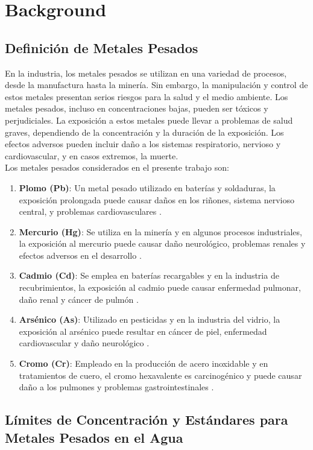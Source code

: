 \section{Background}
\subsection{Definición de Metales Pesados}
En la industria, los metales pesados se utilizan en una variedad de procesos, desde la manufactura hasta la minería. Sin embargo, la manipulación y control de estos metales presentan serios riesgos para la salud y el medio ambiente. Los metales pesados, incluso en concentraciones bajas, pueden ser tóxicos y perjudiciales. La exposición a estos metales puede llevar a problemas de salud graves, dependiendo de la concentración y la duración de la exposición. Los efectos adversos pueden incluir daño a los sistemas respiratorio, nervioso y cardiovascular, y en casos extremos, la muerte.\\

Los metales pesados considerados en el presente trabajo son:
\begin{enumerate}
    \item \textbf{Plomo (Pb)}: Un metal pesado utilizado en baterías y soldaduras, la exposición prolongada puede causar daños en los riñones, sistema nervioso central, y problemas cardiovasculares \cite{matthews2019}.
    \item \textbf{Mercurio (Hg)}: Se utiliza en la minería y en algunos procesos industriales, la exposición al mercurio puede causar daño neurológico, problemas renales y efectos adversos en el desarrollo \cite{rao2020}.
    \item \textbf{Cadmio (Cd)}: Se emplea en baterías recargables y en la industria de recubrimientos, la exposición al cadmio puede causar enfermedad pulmonar, daño renal y cáncer de pulmón \cite{nguyen2022}.
    \item \textbf{Arsénico (As)}: Utilizado en pesticidas y en la industria del vidrio, la exposición al arsénico puede resultar en cáncer de piel, enfermedad cardiovascular y daño neurológico \cite{smith2021}.
    \item \textbf{Cromo (Cr)}: Empleado en la producción de acero inoxidable y en tratamientos de cuero, el cromo hexavalente es carcinogénico y puede causar daño a los pulmones y problemas gastrointestinales \cite{johnson2023}.
\end{enumerate}

\subsection{Límites de Concentración y Estándares para Metales Pesados en el Agua}

